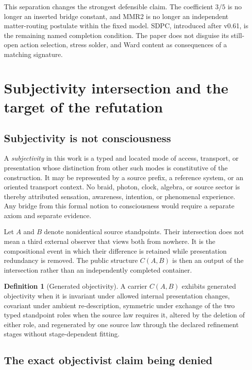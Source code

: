 \documentclass[11pt]{article}
\theoremstyle{definition}
\newtheorem{definition}[theorem]{Definition}
\theoremstyle{remark}
\begin{document}
This separation changes the strongest defensible claim. The coefficient $3/5$ is no longer an inserted bridge constant, and MMR2 is no longer an independent matter-routing postulate within the fixed model. SDPC, introduced after v0.61, is the remaining named completion condition. The paper does not disguise its still-open action selection, stress solder, and Ward content as consequences of a matching signature.

\section{Subjectivity intersection and the target of the refutation}

\subsection{Subjectivity is not consciousness}

A \emph{subjectivity} in this work is a typed and located mode of access, transport, or presentation whose distinction from other such modes is constitutive of the construction. It may be represented by a source prefix, a reference system, or an oriented transport context. No braid, photon, clock, algebra, or source sector is thereby attributed sensation, awareness, intention, or phenomenal experience. Any bridge from this formal notion to consciousness would require a separate axiom and separate evidence.

Let $A$ and $B$ denote nonidentical source standpoints. Their intersection does not mean a third external observer that views both from nowhere. It is the compositional event in which their difference is retained while presentation redundancy is removed. The public structure $C(A,B)$ is then an output of the intersection rather than an independently completed container.

\begin{definition}[Generated objectivity]
A carrier $C(A,B)$ exhibits generated objectivity when it is invariant under allowed internal presentation changes, covariant under ambient re-description, symmetric under exchange of the two typed standpoint roles when the source law requires it, altered by the deletion of either role, and regenerated by one source law through the declared refinement stages without stage-dependent fitting.
\end{definition}

\subsection{The exact objectivist claim being denied}
\end{document}
